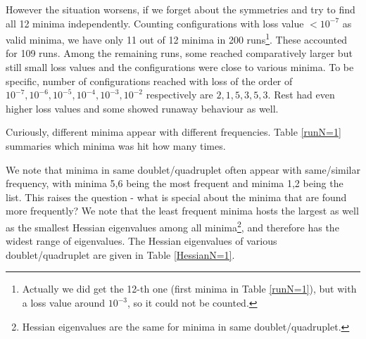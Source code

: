 \documentclass[12pt,a4paper]{JHEP3}
\begin{document}
However the situation worsens, if we forget about the symmetries and try to find all 12 minima independently. 
Counting  configurations with loss value $< 10^{-7}$ as valid  minima, we have only 11 out of 12 minima in 200 runs\footnote{Actually we did get the 12-th  one (first minima in Table  \ref{runN=1}), but with a loss value around $10^{-3}$, so it could not be counted.}. These accounted for 109 runs. Among the remaining runs, some reached comparatively larger but still small loss values and the configurations were close to various minima.
To be specific, number of configurations reached with loss of the order of $10^{-7}, 10^{-6}, 10^{-5}, 10^{-4}, 10^{-3}, 10^{-2}$ respectively are $2,1,5,3,5,3$. 
Rest had even higher loss values and some showed runaway behaviour as well.

Curiously, different minima appear with different frequencies. Table \ref{runN=1} summaries which minima was hit how many times. 
\begin{table}[htb]
\begin{center}
\end{center}
\caption{Number of times various minima for N=1 was found (out of 200 runs), i.e. loss function dipped below $10^{-7}$}\label{runN=1}
\end{table}
%
We note that minima in same doublet/quadruplet often appear with same/similar frequency, with minima 5,6 being the most frequent and minima 1,2 being the list. This raises the question -  what is special about  the minima that are found more frequently? We note that the  least frequent minima hosts the largest as well as the smallest Hessian eigenvalues among all minima\footnote{Hessian eigenvalues are the same for minima in same doublet/quadruplet.}, and therefore has the widest range of eigenvalues. The  Hessian eigenvalues of various doublet/quadruplet are given in Table \ref{HessianN=1}. 
\end{document}
